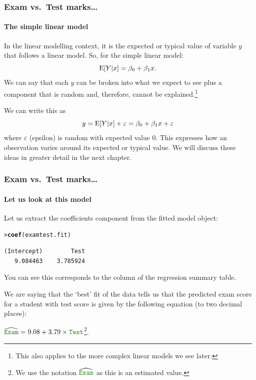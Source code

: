\documentclass{beamer}\usepackage[]{graphicx}\usepackage[]{xcolor}
\makeatletter
\newcommand{\hlstd}[1]{\textcolor[rgb]{0.345,0.345,0.345}{#1}}%
\newcommand{\hlkwd}[1]{\textcolor[rgb]{0.737,0.353,0.396}{\textbf{#1}}}%
\newenvironment{kframe}{%
 \def\at@end@of@kframe{}%
 \ifinner\ifhmode%
  \def\at@end@of@kframe{\end{minipage}}%
  \begin{minipage}{\columnwidth}%
 \fi\fi%
 \def\FrameCommand##1{\hskip\@totalleftmargin \hskip-\fboxsep
 \colorbox{shadecolor}{##1}\hskip-\fboxsep
     \hskip-\linewidth \hskip-\@totalleftmargin \hskip\columnwidth}%
 \MakeFramed {\advance\hsize-\width
   \@totalleftmargin\z@ \linewidth\hsize
   \@setminipage}}%
 {\par\unskip\endMakeFramed%
 \at@end@of@kframe}
\newenvironment{knitrout}{}{} %
\makeatother
\begin{document}
\begin{frame}[fragile]
\frametitle{Exam vs.\ Test marks\ldots}
\framesubtitle{The simple linear model}
In the linear modelling context,
it is the expected or typical value of variable $y$ that follows a linear model. 
So, for the simple linear model:
\[
\operatorname{E}[Y|x]=\beta_0+\beta_{1}x.
\]
We can say that each $y$ can be broken into what we expect to see plus a component that is random and, therefore, cannot be explained.\footnote{This also applies to the more complex linear models we see later.}

We can write this as
\[
y=\operatorname{E}[Y|x]+\varepsilon=\beta_0+\beta_{1}x+\varepsilon
\]
where $\varepsilon$ (epsilon) is random with expected value 0. This expresses how an observation varies around its expected or typical value. We will discuss these ideas  in greater detail in the next chapter.

\end{frame}


\begin{frame}[fragile]
\frametitle{Exam vs.\ Test marks\ldots}
\framesubtitle{Let us look at this model}

Let us extract the coefficients component from the fitted model object:

\begin{knitrout}\scriptsize
{}\color{fgcolor}\begin{kframe}
\begin{alltt}
\hlstd{> }\hlkwd{coef}\hlstd{(examtest.fit)}
\end{alltt}
\begin{verbatim}
(Intercept)        Test 
   9.084463    3.785924 
\end{verbatim}
\end{kframe}
\end{knitrout}



You can see this corresponds to the  column of the regression summary table.

We are saying that the `best' fit of the data tells us that the predicted exam score
for a student with test score  is given by the
following equation (to two decimal places):
\begin{center}
$ \widehat{\rcode{Exam}}=9.08+3.79\times \rcode{Test}$\footnote{ We use the notation $\widehat{\rcode{Exam}}$ as this is an estimated value.}.
\end{center}

\end{frame}
\end{document}
